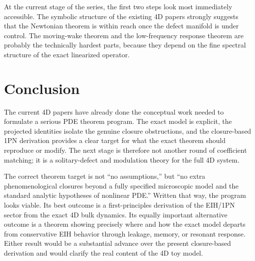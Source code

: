 \documentclass[11pt]{article}
\begin{document}
At the current stage of the series, the first two steps look most immediately accessible. The symbolic structure of the existing 4D papers strongly suggests that the Newtonian theorem is within reach once the defect manifold is under control. The moving-wake theorem and the low-frequency response theorem are probably the technically hardest parts, because they depend on the fine spectral structure of the exact linearized operator.

\section{Conclusion}
\label{sec:conclusion}

The current 4D papers have already done the conceptual work needed to formulate a serious PDE theorem program. The exact model is explicit, the projected identities isolate the genuine closure obstructions, and the closure-based 1PN derivation provides a clear target for what the exact theorem should reproduce or modify. The next stage is therefore not another round of coefficient matching; it is a solitary-defect and modulation theory for the full 4D system.

The correct theorem target is not ``no assumptions,'' but ``no extra phenomenological closures beyond a fully specified microscopic model and the standard analytic hypotheses of nonlinear PDE.'' Written that way, the program looks viable. Its best outcome is a first-principles derivation of the EIH/1PN sector from the exact 4D bulk dynamics. Its equally important alternative outcome is a theorem showing precisely where and how the exact model departs from conservative EIH behavior through leakage, memory, or resonant response. Either result would be a substantial advance over the present closure-based derivation and would clarify the real content of the 4D toy model.
\end{document}
